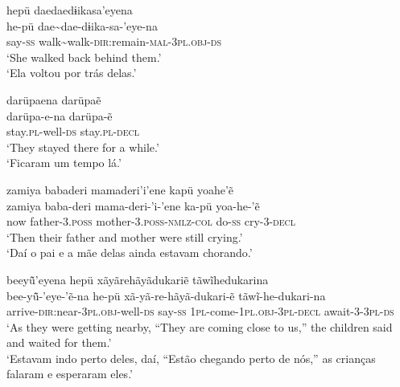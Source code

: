 \documentclass[output=paper,
modfonts,nonflat
]{langsci/langscibook}
\begin{document}
\ea   hepü daedaedɨikasa'eyena \\[.3em]
\gll 	he-pü dae\textasciitilde dae-dɨika-sa-'eye-na\\
say-\textsc{ss} walk\textasciitilde walk-\textsc{dir:}remain-\textsc{mal-3pl.obj-ds}\\                           
\glt  `She walked back behind them.' \\
`Ela voltou por trás delas.'\\
\z  


\ea  darüpaena darüpaẽ \\[.3em]
\gll 	darüpa-e-na darüpa-ẽ \\
stay.\textsc{pl}-well-\textsc{ds} stay.\textsc{pl}-\textsc{decl}\\
\glt    `They stayed there for a while.'\\
`Ficaram um tempo lá.' \\
\z  

\ea   zamiya babaderi mamaderi'i'ene kapü yoahe'ẽ \\[.3em]
\gll 	zamiya baba-deri mama-deri-'i-'ene ka-pü yoa-he-'ẽ\\
now father-\textsc{3.poss} mother-\textsc{3.poss-nmlz-col} do-\textsc{ss} cry-\textsc{3-decl}\\
\glt  `Then their father and mother were still crying.' \\
`Daí o pai e a mãe delas ainda estavam chorando.'\\
\z  

\ea   beeyü̃'eyena hepü xãyãrehãyãdukariẽ tãwĩhedukarina \\[.3em]
\gll 	bee-yü̃-'eye-'ẽ-na he-pü xã-yã-re-hãyã-dukari-ẽ tãwĩ-he-dukari-na\\
arrive-\textsc{dir}:near-\textsc{3pl.obj}-well-\textsc{ds} say-\textsc{ss} \textsc{1pl}-come-\textsc{1pl.obj-3pl-decl} await-\textsc{3-3pl-ds}\\
\glt    `As they were getting nearby, ``They are coming close to us,'' the children said and waited for them.' \\
`Estavam indo perto deles, daí, ``Estão chegando perto de nós,'' as crianças falaram e esperaram eles.' \\
\z           
\end{document}
